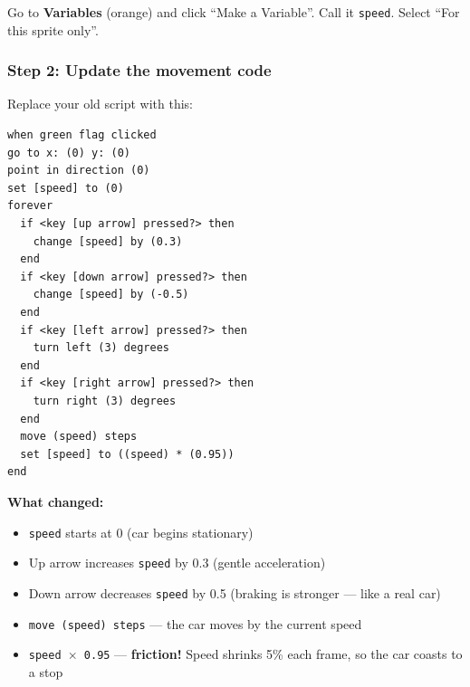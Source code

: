 \documentclass[11pt,a4paper]{article}
\begin{document}
Go to \textbf{Variables} (orange) and click ``Make a Variable''. Call it \texttt{speed}. Select ``For this sprite only''.

\subsubsection{Step 2: Update the movement code}

Replace your old script with this:

\begin{scratchblockbox}
\begin{lstlisting}[style=scratch]
when green flag clicked
go to x: (0) y: (0)
point in direction (0)
set [speed] to (0)
forever
  if <key [up arrow] pressed?> then
    change [speed] by (0.3)
  end
  if <key [down arrow] pressed?> then
    change [speed] by (-0.5)
  end
  if <key [left arrow] pressed?> then
    turn left (3) degrees
  end
  if <key [right arrow] pressed?> then
    turn right (3) degrees
  end
  move (speed) steps
  set [speed] to ((speed) * (0.95))
end
\end{lstlisting}
\end{scratchblockbox}

\textbf{What changed:}
\begin{itemize}[nosep]
  \item \texttt{speed} starts at 0 (car begins stationary)
  \item Up arrow increases \texttt{speed} by 0.3 (gentle acceleration)
  \item Down arrow decreases \texttt{speed} by 0.5 (braking is stronger --- like a real car)
  \item \texttt{move (speed) steps} --- the car moves by the current speed
  \item \texttt{speed $\times$ 0.95} --- \textbf{friction!} Speed shrinks 5\% each frame, so the car coasts to a stop
\end{itemize}

\begin{center}
\end{center}
\end{document}
